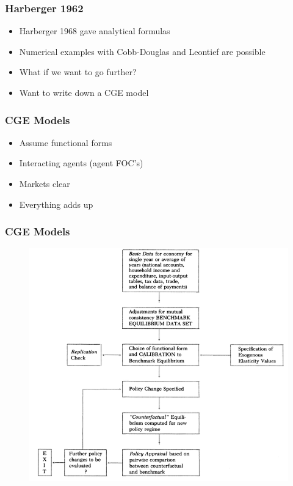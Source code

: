 \documentclass{beamer}
\begin{document}
\begin{frame}
\frametitle[alignment=center]{Harberger 1962}
\begin{itemize}
\item Harberger 1968 gave analytical formulas
\bigskip
\item Numerical examples with Cobb-Douglas and Leontief are possible
\bigskip
\item  What if we want to go further?
\bigskip
\item Want to write down a CGE model
\end{itemize}
\end{frame}

\begin{frame}
\frametitle[alignment=center]{CGE Models}
\begin{itemize}
\item Assume functional forms
\bigskip
\item Interacting agents (agent FOC's)
\bigskip
\item Markets clear
\bigskip
\item Everything adds up
\end{itemize}
\end{frame}

\begin{frame}
\frametitle[alignment=center]{CGE Models}
\begin{figure}
\centering
\includegraphics[scale=0.34]{Figures/Shoven_Whalley_1984.png}
\end{figure}
\end{frame}
\end{document}
